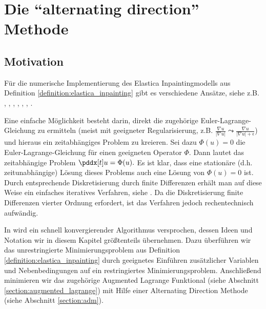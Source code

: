 \documentclass{mythesis}
\begin{document}
\chapter{Die “alternating direction” Methode} \label{chap:adm}


\section{Motivation} %


Für die numerische Implementierung des Elastica Inpaintingmodells aus Definition \ref{definition:elastica_inpainting} gibt es verschiedene Ansätze, siehe z.B. \cite{shen2002euler}, \cite{tai2011fast}, \cite{ballester2001filling}, \cite{brito2010fast}, \cite{yashtini2015alternating}, \cite{hahn2011fast}, \cite{duan2013fast}.

Eine einfache Möglichkeit besteht darin, direkt die zugehörige Euler-Lagrange-Gleichung zu ermitteln (meist mit geeigneter Regularisierung, z.B. $\frac{\nabla u}{|\nabla u|} \leadsto \frac{\nabla u}{|\nabla u| + \epsilon}$) und hieraus ein zeitabhängiges Problem zu kreieren.
Sei dazu $\Phi(u) = 0$ die Euler-Lagrange-Gleichung für einen geeigneten Operator $\Phi$.
Dann lautet das zeitabhängige Problem
\begin{math}
    \pddx[t] u = \Phi(u).
\end{math}
Es ist klar, dass eine stationäre (d.h. zeitunabhängige) Lösung dieses Problems auch eine Lösung von $\Phi(u) = 0$ ist.
Durch entsprechende Diskretisierung durch finite Differenzen erhält man auf diese Weise ein einfaches iteratives Verfahren, siehe \cite{shen2002euler}.
Da die Diskretisierung finite Differenzen vierter Ordnung erfordert, ist das Verfahren jedoch rechentechnisch aufwändig.

In \cite{tai2011fast} wird ein schnell konvergierender Algorithmus versprochen, dessen Ideen und Notation wir in diesem Kapitel größtenteils übernehmen.
Dazu überführen wir das unrestringierte Minimierungsproblem aus Definition \ref{definition:elastica_inpainting} durch geeignetes Einführen zusätzlicher Variablen und Nebenbedingungen auf ein restringiertes Minimierungsproblem.
Anschließend minimieren wir das zugehörige Augmented Lagrange Funktional (siehe Abschnitt \ref{section:augmented_lagrange}) mit Hilfe einer Alternating Direction Methode (siehe Abschnitt \ref{section:adm}).
\end{document}

